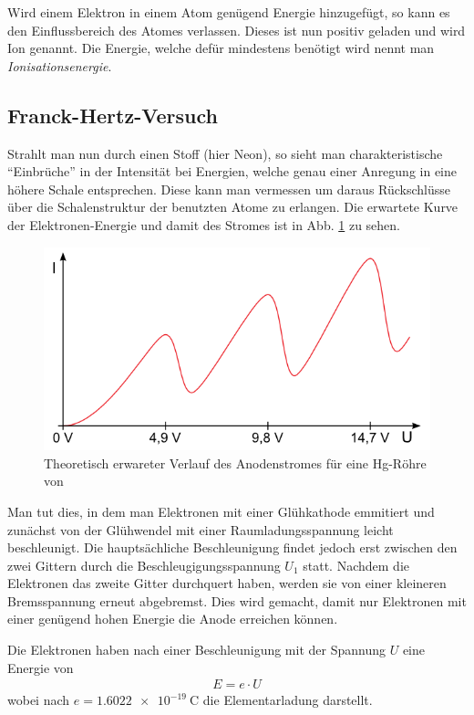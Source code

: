 \documentclass[12pt,a4paper,titlepage,headinclude,bibtotoc]{scrartcl}
\begin{document}
Wird einem Elektron in einem Atom genügend Energie hinzugefügt, so kann es den Einflussbereich des Atomes verlassen.
Dieses ist nun positiv geladen und wird Ion genannt.
Die Energie, welche defür mindestens benötigt wird nennt man \textit{Ionisationsenergie}.

\subsection{Franck-Hertz-Versuch}
Strahlt man nun durch einen Stoff (hier Neon), so sieht man charakteristische "`Einbrüche"' in der Intensität bei Energien, welche genau einer Anregung in eine höhere Schale entsprechen.
Diese kann man vermessen um daraus Rückschlüsse über die Schalenstruktur der benutzten Atome zu erlangen.
Die erwartete Kurve der Elektronen-Energie und damit des Stromes ist in Abb. \ref{fig:theoKurve} zu sehen.
\begin{figure}[h]
\centering
\includegraphics{theoKurve}
\caption{Theoretisch erwareter Verlauf des Anodenstromes für eine Hg-Röhre von \cite[12.03.2015,16 Uhr]{lp22}}
\label{fig:theoKurve}
\end{figure}
Man tut dies, in dem man Elektronen mit einer Glühkathode emmitiert und zunächst von der Glühwendel mit einer Raumladungsspannung leicht beschleunigt.
Die hauptsächliche Beschleunigung findet jedoch erst zwischen den zwei Gittern durch die Beschleugigungsspannung $U_1$ statt.
Nachdem die Elektronen das zweite Gitter durchquert haben, werden sie von einer kleineren Bremsspannung erneut abgebremst.
Dies wird gemacht, damit nur Elektronen mit einer genügend hohen Energie die Anode erreichen können.

Die Elektronen haben nach einer Beschleunigung mit der Spannung $U$ eine Energie von 
\begin{align}
E=e\cdot U\label{eq:EU}
\end{align}
wobei nach \cite[S. 32]{demtroeder2} $e = \SI{1.6022e-19}{\coulomb}$ die Elementarladung darstellt.
\end{document}
